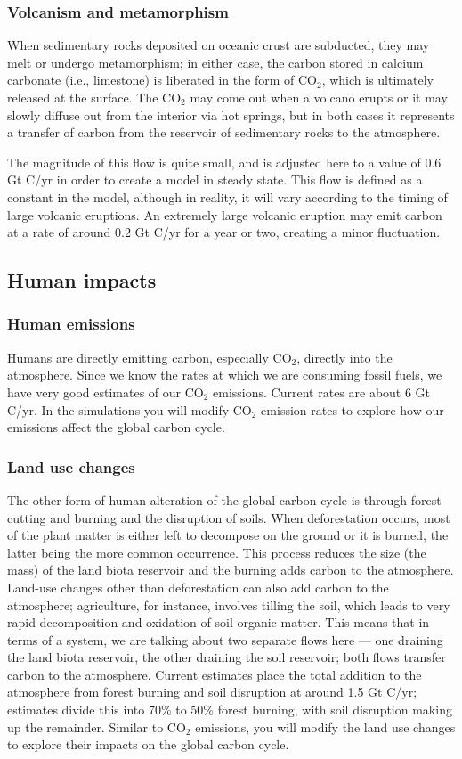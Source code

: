 \documentclass[11pt,letterpaper]{article}
\begin{document}
\subsubsection*{Volcanism and metamorphism}
When sedimentary rocks deposited on oceanic crust are subducted, they may melt or undergo metamorphism; in either case, the carbon stored in calcium carbonate (i.e., limestone) is liberated in the form of CO$_2$, which is ultimately released at the surface. The CO$_2$ may come out when a volcano erupts or it may slowly diffuse out from the interior via hot springs, but in both cases it represents a transfer of carbon from the reservoir of sedimentary rocks to the atmosphere. 

The magnitude of this flow is quite small, and is adjusted here to a value of 0.6 Gt C/yr in order to create a model in steady state. This flow is defined as a constant in the model, although in reality, it will vary according to the timing of large volcanic eruptions. An extremely large volcanic eruption may emit carbon at a rate of around 0.2 Gt C/yr for a year or two, creating a minor fluctuation.

\subsection*{Human impacts}
\subsubsection*{Human emissions}
Humans are directly emitting carbon, especially CO$_2$, directly into the atmosphere. Since we know the rates at which we are consuming fossil fuels, we have very good estimates of our CO$_2$ emissions. Current rates are about 6 Gt C/yr. In the simulations you will modify CO$_2$ emission rates to explore how our emissions affect the global carbon cycle.

\subsubsection*{Land use changes}
The other form of human alteration of the global carbon cycle is through forest cutting and burning and the disruption of soils. When deforestation occurs, most of the plant matter is either left to decompose on the ground or it is burned, the latter being the more common occurrence. This process reduces the size (the mass) of the land biota reservoir and the burning adds carbon to the atmosphere. Land-use changes other than deforestation can also add carbon to the atmosphere; agriculture, for instance, involves tilling the soil, which leads to very rapid decomposition and oxidation of soil organic matter. This means that in terms of a system, we are talking about two separate flows here --- one draining the land biota reservoir, the other draining the soil reservoir; both flows transfer carbon to the atmosphere. Current estimates place the total addition to the atmosphere from forest burning and soil disruption at around 1.5 Gt C/yr; estimates divide this into 70\% to 50\% forest burning, with soil disruption making up the remainder. Similar to CO$_2$ emissions, you will modify the land use changes to explore their impacts on the global carbon cycle.
\end{document}
